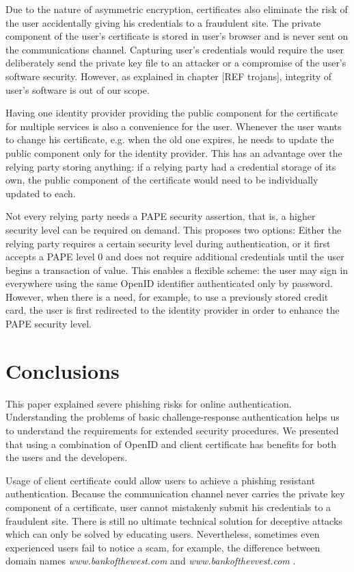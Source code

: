 \documentclass{tktltiki}
\begin{document}
    Due to the nature of asymmetric encryption, certificates also eliminate the risk of the user accidentally giving his credentials to a fraudulent site. The private component of the user's certificate is stored in user's browser and is never sent on the communications channel. Capturing user's credentials would require the user deliberately send the private key file to an attacker or a compromise of the user's software security. However, as explained in chapter [REF trojans], integrity of user's software is out of our scope. 

      Having one identity provider providing the public component for the certificate for multiple services is also a convenience for the user. Whenever the user wants to change his certificate, e.g. when the old one expires, he needs to update the public component only for the identity provider. This has an advantage over the relying party storing anything: if a relying party had a credential storage of its own, the public component of the certificate would need to be individually updated to each.

      Not every relying party needs a PAPE security assertion, that is, a higher security level can be required on demand. This proposes two options: Either the relying party requires a certain security level during authentication, or it first accepts a PAPE level 0 and does not require additional credentials until the user begins a transaction of value. This enables a flexible scheme: the user may sign in everywhere using the same OpenID identifier authenticated only by password. However, when there is a need, for example, to use a previously stored credit card, the user is first redirected to the identity provider in order to enhance the PAPE security level.
      

\section{Conclusions}

      This paper explained severe phishing risks for online authentication. Understanding the problems of basic challenge-response authentication helps us to understand the requirements for extended security procedures. We presented that using a combination of OpenID and client certificate has benefits for both the users and the developers.
      
      Usage of client certificate could allow users to achieve a phishing resistant authentication. Because the communication channel never carries the private key component of a certificate, user cannot mistakenly submit his credentials to a fraudulent site. There is still no ultimate technical solution for deceptive attacks which can only be solved by educating users. Nevertheless, sometimes even experienced users fail to notice a scam, for example, the difference between domain names 
\emph{www.bankofthewest.com} and \emph{www.bankofthevvest.com} \cite{why_phishing_works_06}.
      
\end{document}
